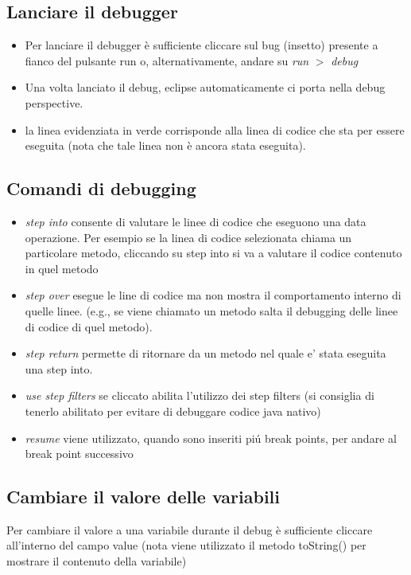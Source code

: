\documentclass{article}
\begin{document}
\subsection{Lanciare il debugger}
\begin{itemize}
\item Per lanciare il debugger \`e sufficiente cliccare sul bug (insetto) presente a fianco del pulsante run o, alternativamente, andare su \textit{run} $>$ \textit{debug}
\item Una volta lanciato il debug, eclipse automaticamente ci porta nella debug perspective.
\item la linea evidenziata in verde corrisponde alla linea di codice che sta per essere eseguita (nota che tale linea non \`e ancora stata eseguita).
\end{itemize}

\subsection{Comandi di debugging}

\begin{itemize}
\item \textit{step into} consente di valutare le linee di codice che eseguono una data operazione. Per esempio se la linea di codice selezionata chiama un particolare metodo, cliccando su step into si va a valutare il codice contenuto in quel metodo
\item \textit{step over} esegue le line di codice ma non mostra il comportamento interno di quelle linee. (e.g., se viene chiamato un metodo salta il debugging delle linee di codice di quel metodo).
\item \textit{step return} permette di ritornare da un metodo nel quale e' stata eseguita una step into.
\item \textit{use step filters} se cliccato abilita l'utilizzo dei step filters (si consiglia di tenerlo abilitato per evitare di debuggare codice java nativo)
\item \textit{resume} viene utilizzato, quando sono inseriti pi\' u break points, per andare al break point successivo
\end{itemize}

\subsection{Cambiare il valore delle variabili}
Per cambiare il valore a una variabile durante il debug \`e sufficiente cliccare all'interno del campo value (nota viene utilizzato il metodo toString() per mostrare il contenuto della variabile)
\end{document}
